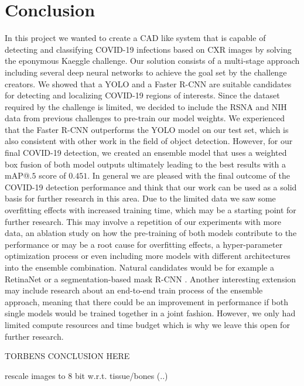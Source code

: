 \chapter{Conclusion}\label{chapter:conclusion}

In this project we wanted to create a \ac{CAD} like system that is capable of detecting and classifying COVID-19 infections based on \acl{CXR} images by solving the eponymous Kaeggle challenge. Our solution consists of a multi-stage approach including several deep neural networks to achieve the goal set by the challenge creators. We showed that a \ac{YOLO} and a Faster \ac{R-CNN} are suitable candidates for detecting and localizing COVID-19 regions of interests. Since the dataset required by the challenge is limited, we decided to include the \ac{RSNA} and \ac{NIH} data from previous challenges to pre-train our model weights.
We experienced that the Faster \ac{R-CNN} outperforms the \ac{YOLO} model on our test set, which is also consistent with other work in the field of object detection. However, for our final COVID-19 detection, we created an ensemble model that uses a weighted box fusion of both model outputs ultimately leading to the best results with a \ac{mAP}@$.5$ score of $0.451$. In general we are pleased with the final outcome of the COVID-19 detection performance and think that our work can be used as a solid basis for further research in this area. Due to the limited data we saw some overfitting effects with increased training time, which may be a starting point for further research. This may involve a repetition of our experiments with more data, an ablation study on how the pre-training of both models contribute to the performance or may be a root cause for overfitting effects, a hyper-parameter optimization process or even including more models with different architectures into the ensemble combination. Natural candidates would be for example a RetinaNet \autocite{lin_focal_2018} or a segmentation-based mask R-CNN \autocite{maskRcnn}.
Another interesting extension may include research about an end-to-end train process of the ensemble approach, meaning that there could be an improvement in performance if both single models would be trained together in a joint fashion. However, we only had limited compute resources and time budget which is why we leave this open for further research.

TORBENS CONCLUSION HERE

rescale images to 8 bit w.r.t. tissue/bones (..)

